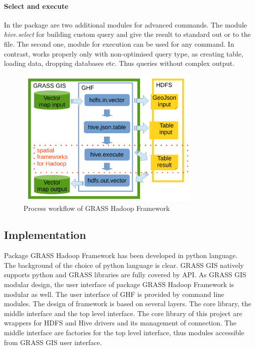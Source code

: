 \documentclass[a4paper,12pt,oneside]{report}
\begin{document}
    \paragraph{Select and execute} In the package are two additional modules for
    advanced commands. The module \textit{hive.select} for building custom query
    and give the result to standard out or to the file. The second one, module for
    execution can be used for any command. In contrast, works properly only with
    non-optimised query type, as creating table, loading data, dropping databases
    etc. Thus queries without complex output.
	
	
	\begin{figure}[!htbp]
		\centering
		\includegraphics[width=0.8\textwidth]{./img/modules_schema.pdf}
		\caption[GHF workflow]{\centering Process workflow of GRASS Hadoop Framework 
		}
	\end{figure} 
	
	\subsection{Implementation}
	Package GRASS Hadoop Framework has been developed in python language. The
	background of the choice of python language is clear. GRASS GIS natively
	supports python and GRASS libraries are fully covered by API. As GRASS GIS modular design, the
	user interface of package GRASS Hadoop Framework is modular as well. The user
	interface of GHF is provided by command line modules. 
	The design of framework is based on several layers. The core library, the middle
	interface and the top level interface. The core library of this project are
	wrappers for HDFS and Hive drivers and its management of connection. The middle
	interface are factories for the top level interface, thus modules accessible
	from GRASS GIS user interface.
	
\end{document}
